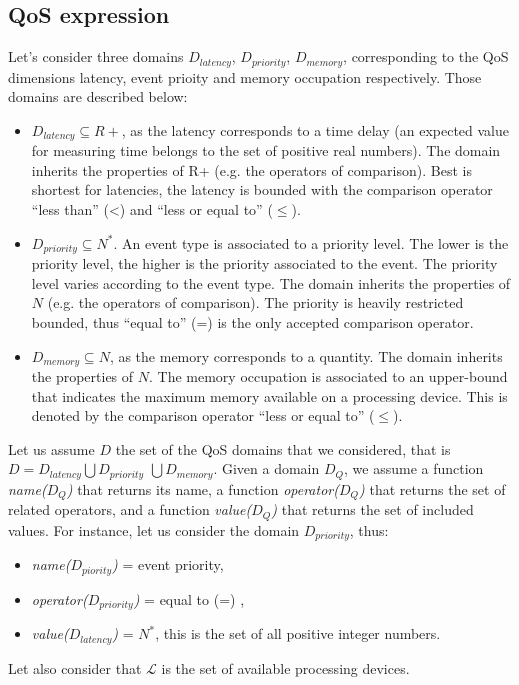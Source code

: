 \subsection{QoS expression}
Let's consider three domains $D_{latency}$, $D_{priority}$, $D_{memory}$, corresponding to the QoS dimensions latency, event prioity and memory occupation respectively.
Those domains are described below:
\begin{itemize}
 \item $D_{latency} \subseteq R+$, as the latency corresponds to a time delay (an expected value for measuring time belongs to the set of positive real numbers). The domain inherits the properties of R+ (e.g. the operators of comparison). Best is shortest for latencies, the latency is bounded with the comparison operator ``less than'' (<) and ``less or equal to'' ($\leq$). 
 \item $D_{priority} \subseteq N^*$. An event type is associated to a priority level. The lower is the priority level, the higher is the priority associated to the event. The priority level varies according to the event type. The domain inherits the properties of $N$ (e.g. the operators of comparison). 
 The priority is heavily restricted bounded, thus ``equal to'' (=) is the only accepted comparison operator.
 \item $D_{memory}  \subseteq N$, as the memory corresponds to a quantity. The domain inherits the properties of $N$. The memory occupation is associated to an upper-bound that indicates the maximum memory available on a processing device. This is denoted by the comparison operator ``less or equal to'' ($\leq$).  
\end{itemize}
Let us assume $D$ the set of the QoS domains that we considered, that is $D = D_{latency} \bigcup D_{priority}$ $ \bigcup D_{memory}$.
Given a domain $D_Q$, we assume a function \textit{name($D_Q$)} that returns its  name, a function \textit{operator($D_Q$)} that returns the set of related operators, and a function \textit{value($D_Q$)} that returns the set of included values.
For instance, let us consider the domain $D_{priority}$, thus: 
\begin{itemize}
 \item \textit{name($D_{piority}$)} = event priority,
 \item \textit{operator($D_{priority}$)} = { equal to (=) },
 \item \textit{value($D_{latency}$)} = $N^*$, this is the set of all positive integer numbers.
\end{itemize}
Let also consider that $\mathcal{L}$ is the set of available processing devices.
